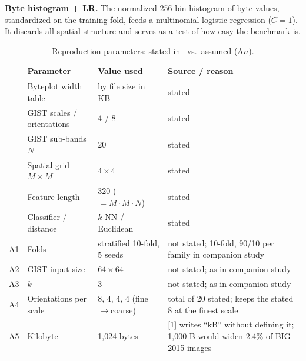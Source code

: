 \documentclass[conference]{IEEEtran}
\begin{document}
\textbf{Byte histogram + LR.} The normalized 256-bin histogram of byte values,
standardized on the training fold, feeds a multinomial logistic regression ($C = 1$).
It discards all spatial structure and serves as a test of how easy the benchmark is.

\begin{table}[t]
\centering
\caption{Reproduction parameters: stated in~\cite{nataraj2011images} vs.\ assumed (A$n$).}
\label{tab:assumptions}
\footnotesize
\begin{tabular}{@{}l p{3.3cm} p{6.2cm} p{6.2cm}@{}}
\toprule
 & Parameter & Value used & Source / reason \\
\midrule
 & Byteplot width table & by file size in KB & stated \cite{nataraj2011images} \\
 & GIST scales / orientations & 4 / 8 & stated \cite{nataraj2011images} \\
 & GIST sub-bands $N$ & 20 & stated \cite{nataraj2011images} \\
 & Spatial grid $M\times M$ & $4\times4$ & stated \cite{nataraj2011images} \\
 & Feature length & 320 ($=M\cdot M\cdot N$) & stated \cite{nataraj2011images} \\
 & Classifier / distance & $k$-NN / Euclidean & stated \cite{nataraj2011images} \\
\midrule
A1 & Folds & stratified 10-fold, 5 seeds & not stated; 10-fold, 90/10 per family in companion study \cite{nataraj2011comparative} \\
A2 & GIST input size & $64\times64$ & not stated; as in companion study \cite{nataraj2011comparative} \\
A3 & $k$ & 3 & not stated; as in companion study \cite{nataraj2011comparative} \\
A4 & Orientations per scale & 8, 4, 4, 4 (fine$\rightarrow$coarse) & total of 20 stated; keeps the stated 8 at the finest scale \\
A5 & Kilobyte & 1,024 bytes & [1] writes ``kB'' without defining it; 1,000 B would widen 2.4\% of BIG 2015 images \\

\end{tabular}
\end{table}
\end{document}
